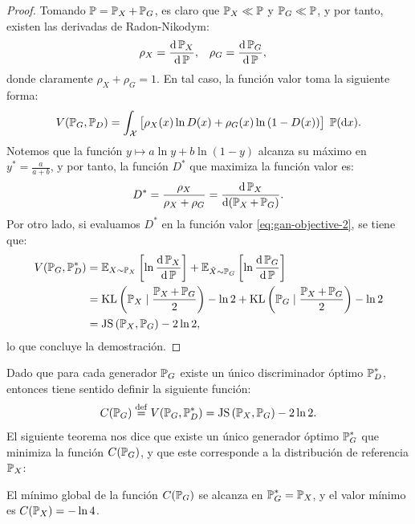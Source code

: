 {{{\begin{proof}
    Tomando $\Prob = \Prob_X + \Prob_G$, es claro que $\Prob_X \ll \Prob$ y $\Prob_G \ll \Prob$, y por tanto, existen las derivadas de Radon-Nikodym:
    \begin{align*}
        \rho_X & = \dv{\Prob_X}{\Prob}, & \rho_G & = \dv{\Prob_G}{\Prob},
    \end{align*}
    donde claramente $\rho_X + \rho_G = 1$. En tal caso, la función valor toma la siguiente forma:
    \begin{equation}
        \label{eq:gan-objective-2}
        V(\Prob_G, \Prob_D) = \int_\cX \big[ \rho_X(x) \ln D(x) + \rho_G(x) \ln \qty(1 - D(x)) \big] \; \Prob(\dd x).
    \end{equation}
    Notemos que la función $y \mapsto a \ln y + b \ln(1-y)$ alcanza su máximo en $y^\ast = \frac{a}{a+b}$, y por tanto, la función $D^\ast$ que maximiza la función valor es:
    \begin{equation}
        D^\ast = \frac{\rho_X}{\rho_X + \rho_G} = \dv{\Prob_X}{(\Prob_X + \Prob_G)} .
    \end{equation}
    Por otro lado, si evaluamos $D^\ast$ en la función valor \eqref{eq:gan-objective-2}, se tiene que:
    \begin{align*}
        V(\Prob_G, \Prob_D^\ast)
         & = \Exp_{X \sim \Prob_X} \left[ \ln \dv{\Prob_X}{\Prob}(X) \right] + \Exp_{\tilde X \sim \Prob_G} \left[ \ln \dv{\Prob_G}{\Prob}(\tilde X) \right] \\
         & = \KL{\Prob_X}{\frac{\Prob_X + \Prob_G}{2}} - \ln 2 + \KL{\Prob_G}{\frac{\Prob_X + \Prob_G}{2}} - \ln 2                                           \\
         & = \JS{\Prob_X}{\Prob_G} - 2 \ln 2,
    \end{align*}
    lo que concluye la demostración.
\end{proof}

Dado que para cada generador $\Prob_G$ existe un único discriminador óptimo $\Prob_D^\ast$, entonces tiene sentido definir la siguiente función:
\begin{equation}
    C(\Prob_G) \eqdef V(\Prob_G, \Prob_D^\ast) = \JS{\Prob_X}{\Prob_G} - 2 \ln 2.
\end{equation}
El siguiente teorema nos dice que existe un único generador óptimo $\Prob_G^\ast$ que minimiza la función $C(\Prob_G)$, y que este corresponde a la distribución de referencia $\Prob_X$:

\begin{theorem}
    El mínimo global de la función $C(\Prob_G)$ se alcanza en $\Prob_G^\ast = \Prob_X$, y el valor mínimo es $C(\Prob_X) = - \ln 4$.
\end{theorem}

}}}
